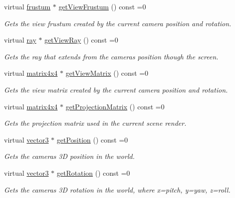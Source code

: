 \begin{DoxyCompactItemize}
virtual \hyperlink{classflounder_1_1frustum}{frustum} $\ast$ \hyperlink{classflounder_1_1icamera_a854ed7169c5514c18e0bb09e97dfcde6}{get\+View\+Frustum} () const =0
\begin{DoxyCompactList}\small\item\em Gets the view frustum created by the current camera position and rotation. \end{DoxyCompactList}\item 
virtual \hyperlink{classflounder_1_1ray}{ray} $\ast$ \hyperlink{classflounder_1_1icamera_ab2ff70f38f2e5a93223d3590b75a3b77}{get\+View\+Ray} () const =0
\begin{DoxyCompactList}\small\item\em Gets the ray that extends from the cameras position though the screen. \end{DoxyCompactList}\item 
virtual \hyperlink{classflounder_1_1matrix4x4}{matrix4x4} $\ast$ \hyperlink{classflounder_1_1icamera_a95b93e33ce9d02b9ea23f7d7f9205d13}{get\+View\+Matrix} () const =0
\begin{DoxyCompactList}\small\item\em Gets the view matrix created by the current camera position and rotation. \end{DoxyCompactList}\item 
virtual \hyperlink{classflounder_1_1matrix4x4}{matrix4x4} $\ast$ \hyperlink{classflounder_1_1icamera_a271f2b8ade572d193b79abcd8a325b89}{get\+Projection\+Matrix} () const =0
\begin{DoxyCompactList}\small\item\em Gets the projection matrix used in the current scene render. \end{DoxyCompactList}\item 
virtual \hyperlink{classflounder_1_1vector3}{vector3} $\ast$ \hyperlink{classflounder_1_1icamera_aa6639f6919b4bc30b05fc8d73bf57ab2}{get\+Position} () const =0
\begin{DoxyCompactList}\small\item\em Gets the cameras 3D position in the world. \end{DoxyCompactList}\item 
virtual \hyperlink{classflounder_1_1vector3}{vector3} $\ast$ \hyperlink{classflounder_1_1icamera_a708d9b2cab040a78e522dc8a9864d959}{get\+Rotation} () const =0
\begin{DoxyCompactList}\small\item\em Gets the cameras 3D rotation in the world, where x=pitch, y=yaw, z=roll. \end{DoxyCompactList}\end{DoxyCompactItemize}



